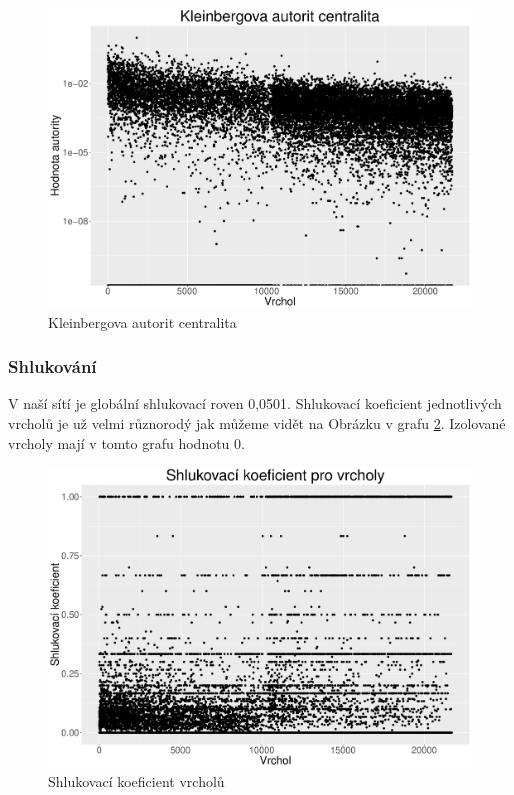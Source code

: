 \documentclass[a4paper,12pt]{article}
\begin{document}
\begin{figure}[h!]
\centering
\includegraphics[scale=0.4]{images/autority.pdf}
\caption{Kleinbergova autorit centralita}
\label{img:autority}
\end{figure}

\FloatBarrier
\subsubsection{Shlukování}
V naší sítí je globální shlukovací roven 0,0501. Shlukovací koeficient jednotlivých vrcholů je už 
velmi různorodý jak můžeme vidět na Obrázku v grafu \ref{img:cluster}. Izolované vrcholy mají v tomto
grafu hodnotu 0.

\begin{figure}[h!]
\centering
\includegraphics[scale=0.4]{images/clustering.pdf}
\caption{Shlukovací koeficient vrcholů}
\label{img:cluster}
\end{figure}
\end{document}
